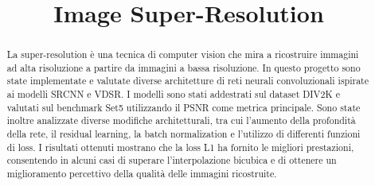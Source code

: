 \documentclass[conference]{IEEEtran}
\begin{document}
\title{Image Super-Resolution}

\author{


}
\maketitle

\begin{abstract}
La super-resolution è una tecnica di computer vision che mira a ricostruire immagini ad alta
risoluzione a partire da immagini a bassa risoluzione.
In questo progetto sono state implementate e valutate diverse
architetture di reti neurali convoluzionali ispirate ai modelli SRCNN e VDSR.
I modelli sono stati addestrati sul dataset DIV2K e valutati sul benchmark Set5
utilizzando il PSNR come metrica principale. Sono state inoltre analizzate diverse
modifiche architetturali, tra cui l'aumento della profondità della rete, il residual learning,
la batch normalization e l'utilizzo di differenti funzioni di loss. I risultati ottenuti mostrano
che la loss L1 ha fornito le migliori prestazioni, consentendo in alcuni casi di superare
l'interpolazione bicubica e di ottenere un miglioramento percettivo della qualità delle immagini
ricostruite.
\end{abstract}







%
%



\end{document}
